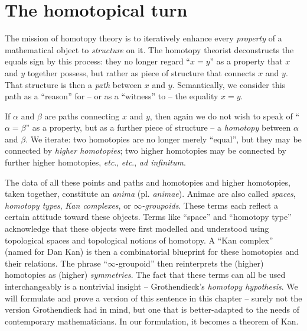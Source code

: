 
\section*{The homotopical turn}%
\label{sec:homotopical}

The mission of homotopy theory is to iteratively enhance every \emph{property} of a mathematical object to \emph{structure} on it.
The homotopy theorist deconstructs the equals sign by this process:
they no longer regard \enquote{$x = y$} as a property that $x$ and $y$ together possess,
but rather as piece of structure that connects $x$ and $y$.
That structure is then a \emph{path} between $x$ and $y$.
Semantically, we consider this path as a \enquote{reason} for -- or as a \enquote{witness} to -- the equality $x = y$.

If $\alpha$ and $\beta$ are paths connecting $x$ and $y$,
then again we do not wish to speak of \enquote{$\alpha = \beta$} as a property,
but as a further piece of structure -- a \emph{homotopy} between $\alpha$ and $\beta$.
We iterate: two homotopies are no longer merely \enquote{equal}, but they may be connected by \emph{higher homotopies};
two higher homotopies may be connected by further higher homotopies, \emph{etc}., \emph{etc}., \emph{ad infinitum}.

The data of all these points and paths and homotopies and higher homotopies, taken together, constitute an \emph{anima} (pl. \emph{animae}).
Animae are also called \emph{spaces}, \emph{homotopy types}, \emph{Kan complexes}, or \emph{$\infty$-groupoids}.
These terms each reflect a certain attitude toward these objects.
Terms like \enquote{space} and \enquote{homotopy type} acknowledge that these objects were first modelled and understood using topological spaces and topological notions of homotopy.
A \enquote{Kan complex} (named for Dan Kan) is then a combinatorial blueprint for these homotopies and their relations.
The phrase \enquote{$\infty$-groupoid} then reinterprets the (higher) homotopies as (higher) \emph{symmetries}.
The fact that these terms can all be used interchangeably is a nontrivial insight -- Grothendieck's \emph{homotopy hypothesis}.
We will formulate and prove a version of this sentence in this chapter -- surely not the version Grothendieck had in mind,
but one that is better-adapted to the needs of contemporary mathematicians.
In our formulation, it becomes a theorem of Kan.

